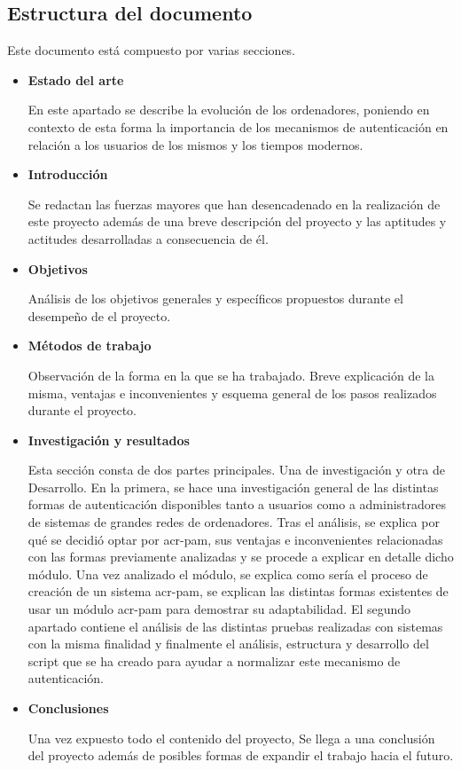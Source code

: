 \documentclass[titlepage, 12pt, a4paper]{article}
\begin{document}
\subsection{Estructura del documento}
Este documento está compuesto por varias secciones.
\begin{itemize}
	\item{\textbf{Estado del arte}}\par
		En este apartado se describe la evolución de los ordenadores, poniendo en contexto de esta forma la importancia de los mecanismos de autenticación en relación a los usuarios de los mismos y los tiempos modernos.
	\item{\textbf{Introducción}}\par
		Se redactan las fuerzas mayores que han desencadenado en la realización de este proyecto además de una breve descripción del proyecto y las aptitudes y actitudes desarrolladas a consecuencia de él.
	\item{\textbf{Objetivos}}\par
		Análisis de los objetivos generales y específicos propuestos durante el desempeño de el proyecto.
	\item{\textbf{Métodos de trabajo}}\par
		Observación de la forma en la que se ha trabajado. Breve explicación de la misma, ventajas e inconvenientes y esquema general de los pasos realizados durante el proyecto.
	\item{\textbf{Investigación y resultados}}\par
		Esta sección consta de dos partes principales. Una de investigación y otra de Desarrollo. En la primera, se hace una investigación general de las distintas formas de autenticación disponibles tanto a usuarios como a administradores de sistemas de grandes redes de ordenadores. Tras el análisis, se explica por qué se decidió optar por \gls{acr-pam}, sus ventajas e inconvenientes relacionadas con las formas previamente analizadas y se procede a explicar en detalle dicho módulo. Una vez analizado el módulo, se explica como sería el proceso de creación de un sistema \gls{acr-pam}, se explican las distintas formas existentes de usar un módulo \gls{acr-pam} para demostrar su adaptabilidad. El segundo apartado contiene el análisis de las distintas pruebas realizadas con sistemas con la misma finalidad y finalmente el análisis, estructura y desarrollo del \gls{script} que se ha creado para ayudar a normalizar este mecanismo de autenticación.
	\item{\textbf{Conclusiones}}\par
		Una vez expuesto todo el contenido del proyecto, Se llega a una conclusión del proyecto además de posibles formas de expandir el trabajo hacia el futuro.
\end{itemize}
\clearpage
\end{document}
